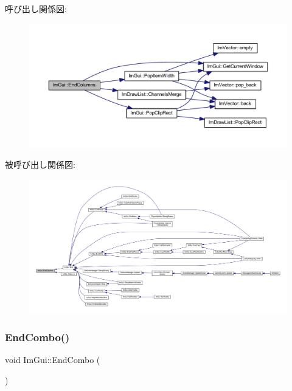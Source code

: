 呼び出し関係図\+:\nopagebreak
\begin{figure}[H]
\begin{center}
\leavevmode
\includegraphics[width=350pt]{namespace_im_gui_af93bed3bce5475fe4d525d744f16aa20_cgraph}
\end{center}
\end{figure}
被呼び出し関係図\+:
\nopagebreak
\begin{figure}[H]
\begin{center}
\leavevmode
\includegraphics[width=350pt]{namespace_im_gui_af93bed3bce5475fe4d525d744f16aa20_icgraph}
\end{center}
\end{figure}
\mbox{\label{namespace_im_gui_a63434692d7de278875c7ea0143fbe6e4}} 
\subsubsection{\texorpdfstring{End\+Combo()}{EndCombo()}}
{\footnotesize\ttfamily void Im\+Gui\+::\+End\+Combo (\begin{DoxyParamCaption}{ }\end{DoxyParamCaption})}



